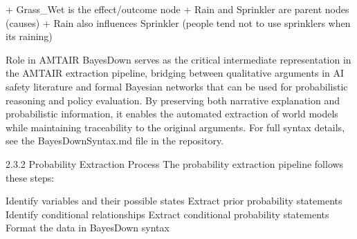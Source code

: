 \documentclass[
  11pt,
  letterpaper,
]{book}
\newenvironment{Shaded}{\begin{snugshade}}{\end{snugshade}}
\newcommand{\ErrorTok}[1]{\textcolor[rgb]{0.68,0.00,0.00}{#1}}
\begin{document}
\begin{Shaded}
\begin{Highlighting}[]
\ErrorTok{+} \ErrorTok{Grass\_Wet} \ErrorTok{is} \ErrorTok{the} \ErrorTok{effect/outcome} \ErrorTok{node}
\ErrorTok{+} \ErrorTok{Rain} \ErrorTok{and} \ErrorTok{Sprinkler} \ErrorTok{are} \ErrorTok{parent} \ErrorTok{nodes} \ErrorTok{(causes)}
\ErrorTok{+} \ErrorTok{Rain} \ErrorTok{also} \ErrorTok{influences} \ErrorTok{Sprinkler} \ErrorTok{(people} \ErrorTok{tend} \ErrorTok{not} \ErrorTok{to} \ErrorTok{use} \ErrorTok{sprinklers} \ErrorTok{when} \ErrorTok{it\textquotesingle{}s} \ErrorTok{raining)}

\ErrorTok{Role} \ErrorTok{in} \ErrorTok{AMTAIR}
\ErrorTok{BayesDown} \ErrorTok{serves} \ErrorTok{as} \ErrorTok{the} \ErrorTok{critical} \ErrorTok{intermediate} \ErrorTok{representation} \ErrorTok{in} \ErrorTok{the} \ErrorTok{AMTAIR} \ErrorTok{extraction} \ErrorTok{pipeline,} \ErrorTok{bridging} \ErrorTok{between} \ErrorTok{qualitative} \ErrorTok{arguments} \ErrorTok{in} \ErrorTok{AI} \ErrorTok{safety} \ErrorTok{literature} \ErrorTok{and} \ErrorTok{formal} \ErrorTok{Bayesian} \ErrorTok{networks} \ErrorTok{that} \ErrorTok{can} \ErrorTok{be} \ErrorTok{used} \ErrorTok{for} \ErrorTok{probabilistic} \ErrorTok{reasoning} \ErrorTok{and} \ErrorTok{policy} \ErrorTok{evaluation.} \ErrorTok{By} \ErrorTok{preserving} \ErrorTok{both} \ErrorTok{narrative} \ErrorTok{explanation} \ErrorTok{and} \ErrorTok{probabilistic} \ErrorTok{information,} \ErrorTok{it} \ErrorTok{enables} \ErrorTok{the} \ErrorTok{automated} \ErrorTok{extraction} \ErrorTok{of} \ErrorTok{world} \ErrorTok{models} \ErrorTok{while} \ErrorTok{maintaining} \ErrorTok{traceability} \ErrorTok{to} \ErrorTok{the} \ErrorTok{original} \ErrorTok{arguments.}
\ErrorTok{For} \ErrorTok{full} \ErrorTok{syntax} \ErrorTok{details,} \ErrorTok{see} \ErrorTok{the} \ErrorTok{BayesDownSyntax.md} \ErrorTok{file} \ErrorTok{in} \ErrorTok{the} \ErrorTok{repository.}

\ErrorTok{2.3.2} \ErrorTok{Probability} \ErrorTok{Extraction} \ErrorTok{Process}
\ErrorTok{The} \ErrorTok{probability} \ErrorTok{extraction} \ErrorTok{pipeline} \ErrorTok{follows} \ErrorTok{these} \ErrorTok{steps:}


\ErrorTok{Identify} \ErrorTok{variables} \ErrorTok{and} \ErrorTok{their} \ErrorTok{possible} \ErrorTok{states}
\ErrorTok{Extract} \ErrorTok{prior} \ErrorTok{probability} \ErrorTok{statements}
\ErrorTok{Identify} \ErrorTok{conditional} \ErrorTok{relationships}
\ErrorTok{Extract} \ErrorTok{conditional} \ErrorTok{probability} \ErrorTok{statements}
\ErrorTok{Format} \ErrorTok{the} \ErrorTok{data} \ErrorTok{in} \ErrorTok{BayesDown} \ErrorTok{syntax}


\end{Highlighting}
\end{Shaded}
\end{document}
